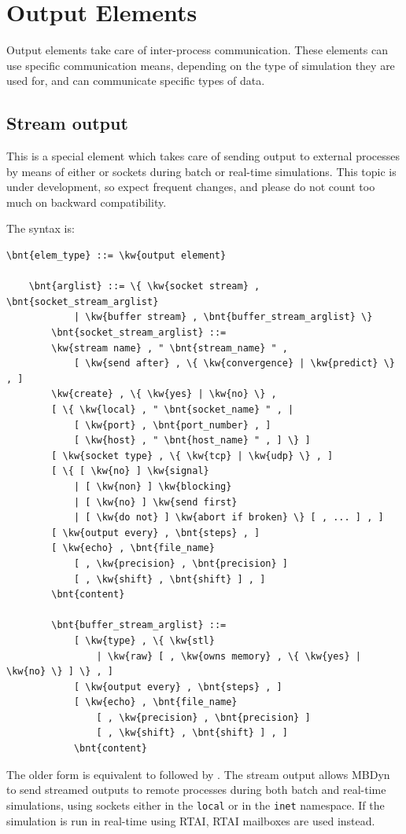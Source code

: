 \section{Output Elements}
Output elements take care of inter-process communication.
These elements can use specific communication means,
depending on the type of simulation they are used for,
and can communicate specific types of data.

\subsection{Stream output}\label{sec:EL:OUTELEM:STREAM_OUTPUT}
This is a special element which takes care of sending output
to external processes by means of either  or  sockets
during batch or real-time simulations.
This topic is under development, so expect frequent changes, and
please do not count too much on backward compatibility.

The syntax is:
\begin{Verbatim}[commandchars=\\\{\}]
    \bnt{elem_type} ::= \kw{output element}

    \bnt{arglist} ::= \{ \kw{socket stream} , \bnt{socket_stream_arglist}
            | \kw{buffer stream} , \bnt{buffer_stream_arglist} \}
        \bnt{socket_stream_arglist} ::=
        \kw{stream name} , " \bnt{stream_name} " ,
            [ \kw{send after} , \{ \kw{convergence} | \kw{predict} \} , ]
        \kw{create} , \{ \kw{yes} | \kw{no} \} ,
        [ \{ \kw{local} , " \bnt{socket_name} " , |
            [ \kw{port} , \bnt{port_number} , ]
            [ \kw{host} , " \bnt{host_name} " , ] \} ]
        [ \kw{socket type} , \{ \kw{tcp} | \kw{udp} \} , ]
        [ \{ [ \kw{no} ] \kw{signal}
            | [ \kw{non} ] \kw{blocking}
            | [ \kw{no} ] \kw{send first}
            | [ \kw{do not} ] \kw{abort if broken} \} [ , ... ] , ]
        [ \kw{output every} , \bnt{steps} , ]
        [ \kw{echo} , \bnt{file_name}
            [ , \kw{precision} , \bnt{precision} ]
            [ , \kw{shift} , \bnt{shift} ] , ]
        \bnt{content}

        \bnt{buffer_stream_arglist} ::=
            [ \kw{type} , \{ \kw{stl}
                | \kw{raw} [ , \kw{owns memory} , \{ \kw{yes} | \kw{no} \} ] \} , ]
            [ \kw{output every} , \bnt{steps} , ]
            [ \kw{echo} , \bnt{file_name}
                [ , \kw{precision} , \bnt{precision} ]
                [ , \kw{shift} , \bnt{shift} ] , ]
            \bnt{content}
\end{Verbatim}
The older form  is equivalent to 
followed by .
The stream output allows MBDyn to send streamed outputs 
to remote processes during both batch and real-time simulations,
using sockets either in the \texttt{local} or in the \texttt{inet} namespace.
If the simulation is run in real-time using RTAI, RTAI mailboxes
are used instead.


